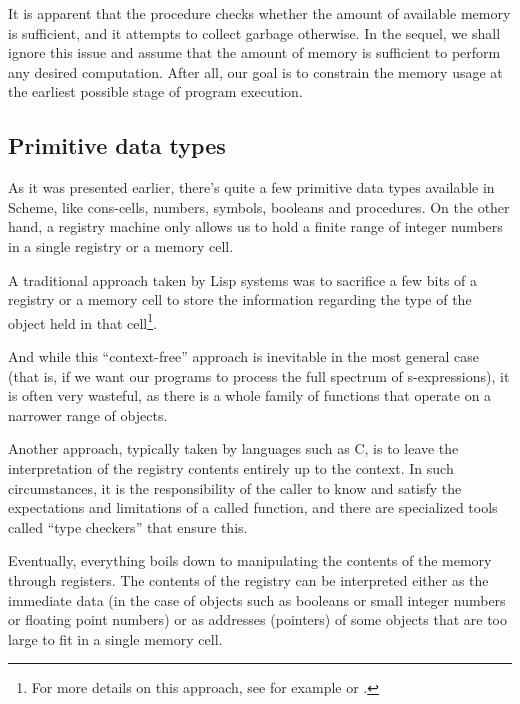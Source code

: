 It is apparent that the procedure checks whether the amount
of available memory is sufficient, and it attempts to collect
garbage otherwise. In the sequel, we shall ignore this issue
and assume that the amount of memory is sufficient to perform
any desired computation. After all, our goal is to constrain
the memory usage at the earliest possible stage of program
execution.

\subsection{Primitive data types}

As it was presented earlier, there's quite a few primitive
data types available in Scheme, like cons-cells, numbers,
symbols, booleans and procedures. On the other hand, a registry
machine only allows us to hold a finite range of integer
numbers in a single registry or a memory cell.

A traditional approach taken by Lisp systems was
to sacrifice a few bits of a registry or a memory cell
to store the information regarding the type of the object
held in that cell\footnote{For more details on this approach, see
  for example \cite{Ghuloum2006} or \cite{Keep2013}.}.

And while this ``context-free'' approach is inevitable
in the most general case (that is, if we want our programs
to process the full spectrum of s-expressions), it is often
very wasteful, as there is a whole family of functions that
operate on a narrower range of objects.

Another approach, typically taken by languages such as C,
is to leave the interpretation of the registry contents
entirely up to the context. In such circumstances, it is
the responsibility of the caller to know and satisfy
the expectations and limitations of a called function,
and there are specialized tools called ``type checkers''
that ensure this.

Eventually, everything boils down to manipulating
the contents of the memory through registers. The contents
of the registry can be interpreted either as the immediate
data (in the case of objects such as booleans or
small integer numbers or floating point numbers)
or as addresses (pointers) of some objects that are
too large to fit in a single memory cell.



